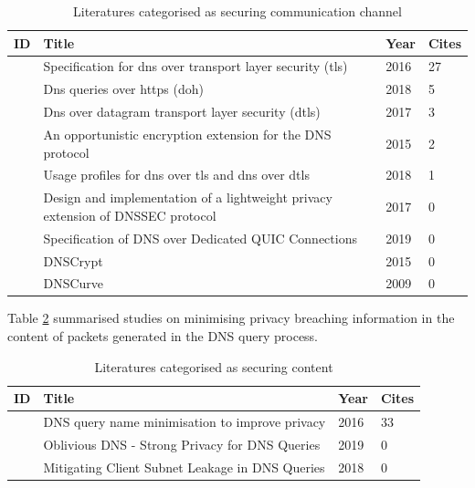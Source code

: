 \documentclass[a4paper,12pt]{article}
\begin{document}
\begin{table}[h!]
    \begin{tabular}{ | l | p{10.5cm} | l | l | }
        \hline
            ID & Title & Year & Cites  \\ \hline
            \cite{hu2016specification} & Specification for dns over transport layer security (tls) & 2016 & 27 \\ \hline
            \cite{rfc8484} & Dns queries over https (doh) & 2018 & 5\\ \hline
            \cite{reddy2017dns} & Dns over datagram transport layer security (dtls) & 2017 & 3\\ \hline
            \cite{bucuti2015opportunistic} & An opportunistic encryption extension for the DNS protocol & 2015 & 2 \\ \hline
            \cite{dickinson2018usage} & Usage profiles for dns over tls and dns over dtls & 2018 & 1 \\ \hline
            \cite{saraj2017design} & Design and implementation of a lightweight privacy extension of DNSSEC protocol & 2017 & 0 \\ \hline
            \cite{dnsoquic} & Specification of DNS over Dedicated QUIC Connections & 2019 & 0 \\ \hline
            \cite{denis2015dnscrypt} & DNSCrypt & 2015 & 0 \\ \hline
            \cite{dempsky2010dnscurve} & DNSCurve & 2009 & 0 \\ \hline
        \end{tabular}
        \caption{Literatures categorised as securing communication channel}
\label{channel}
\end{table}

Table \ref{content} summarised studies on minimising privacy breaching information in the content of packets generated in the DNS query process.

\begin{table}[h!]
    \begin{tabular}{ | l | p{10.5cm} | l | l |}
        \hline
            ID & Title & Year & Cites \\ \hline
            \cite{bortzmeyer2016dns} & DNS query name minimisation to improve privacy & 2016 & 33 \\ \hline
            \cite{annee-dprive-oblivious-dns-00} & Oblivious DNS - Strong Privacy for DNS Queries & 2019 & 0 \\ \hline
            \cite{pan2018mitigating} & Mitigating Client Subnet Leakage in DNS Queries & 2018 & 0 \\ \hline
        \end{tabular}
        \caption{Literatures categorised as securing content}
\label{content}
\end{table}
\end{document}
